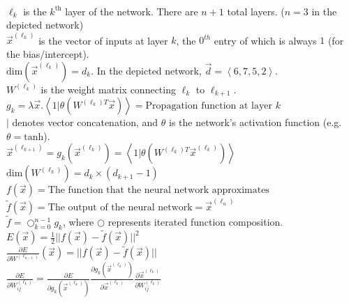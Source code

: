 \documentclass[10pt]{article}
\newcommand\norm[1]{{||}{#1}{||}}
\newcommand\vectorliteral[1]{\left<{#1}\right>}
\begin{document}
\\

\noindent
$\ell_k$ is the $k^\text{th}$ layer of the network. There are $n+1$ total layers. ($n=3$ in the depicted network)\\
$\vec{x}^{(\ell_k)}$ is the vector of inputs at layer $k$, the $0^{th}$ entry of which is always $1$ (for the bias/intercept).\\
$\text{dim}(\vec{x}^{(\ell_k)}) = d_k$. In the depicted network, $\vec{d} = \vectorliteral{6, 7, 5, 2}$.\\
$W^{(\ell_k)}$ is the weight matrix connecting $\ell_k$ to $\ell_{k+1}$.\\
$g_k = \lambda \vec{x}. \vectorliteral{1 | \theta(W^{(\ell_k)T}\vec{x})} = \text{Propagation function at layer $k$}$\\
$|$ denotes vector concatenation, and $\theta$ is the network's activation function (e.g. $\theta = \text{tanh}$).\\
$\vec{x}^{(\ell_{k+1})} = g_k(\vec{x}^{(\ell_k)}) = \vectorliteral{1 | \theta(W^{(\ell_k)T}\vec{x}^{(\ell_k)})}$\\
$\text{dim}(W^{(\ell_k)}) = d_k \times (d_{k+1}-1)$\\
$f(\vec{x}) = \text{The function that the neural network approximates}$\\
$\tilde{f}(\vec{x}) = \text{The output of the neural network} = \vec{x}^{(\ell_{n})}$\\
$\tilde{f} = \bigcirc_{k=0}^{n-1}g_k$, where $\bigcirc$ represents iterated function composition.\\
$E(\vec{x}) = \frac{1}{2}\norm{f(\vec{x}) - \tilde{f}(\vec{x})}^2$\\
$\frac{\partial E}{\partial W^{(\ell_{n-1})}}(\vec{x}) = \norm{f(\vec{x}) - \tilde{f}(\vec{x})}$\\
$\frac{\partial E}{\partial W_{ij}^{(\ell_k)}} =
    \frac{\partial E}{\partial g_k(\vec{x}^{(\ell_k)})}
    \frac{\partial g_k(\vec{x}^{(\ell_k)})}{\partial \vec{x}^{(\ell_k)}}
    \frac{\partial \vec{x}^{(\ell_k)}}{\partial W_{ij}^{(\ell_k)}}$\\
\end{document}
